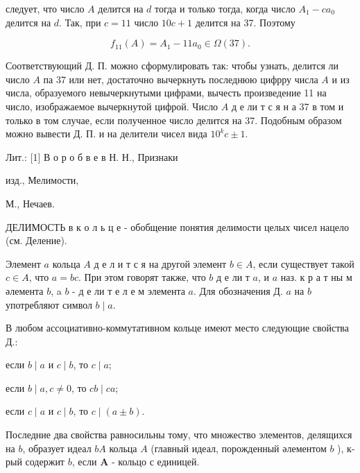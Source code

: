 \documentclass[10pt]{article}
\begin{document}
следует, что число $A$ делится на $d$ тогда и только тогда, когда число $A_{1}-c a_{0}$ делится на $d$. Так, при $c=11$ число $10 c+1$ делится на 37. Поэтому



\[

f_{11}(A)=A_{1}-11 a_{0} \in \Omega(37) .

\]



Соответствующий Д. П. можно сформулировать так: чтобы узнать, делится ли число $A$ па 37 или нет, достаточно вычеркнуть последнюю цифрру числа $A$ и из числа, образуемого невычеркнутыми цифрами, вычесть произведение 11 на число, изображаемое вычеркнутой цифрой. Число $A$ д е ли т с я н а 37 в том и только в том случае, если полученное число делится на 37. Подобным образом можно вывести Д. П. и на делители чисел вида $10^{k} c \pm 1$.



Лит.: [1] В о р о б в е в Н. Н., Признаки

изд., Мелимости,

М., Нечаев.



ДЕЛИМОСТЬ в к о л ь ц е - обобщение понятия делимости целых чисел нацело (см. Деление).



Элемент $a$ кольца $A$ д е л и т с я на другой элемент $b \in A$, если существует такой $c \in A$, что $a=b c$. При этом говорят также, что $b$ д е ли т $a$, и $a$ наз. к р а т ны м әлемента $b$, a $b$ - д е ли т е л е м элемента $a$. Для обозначения Д. $a$ на $b$ употребляют символ $b \mid a$.



В любом ассоциативно-коммутативном кольце имеют место следующие свойства Д.:



если $b \mid a$ и $c \mid b$, то $c \mid a$;



если $b \mid a, c \neq 0$, то $c b \mid c a$;



если $c \mid a$ и $c \mid b$, то $c \mid(a \pm b)$.



Последние два свойства равносильны тому, что множество элементов, делящихся на $b$, образует идеал $b A$ кольца $A$ (главный идеал, порожденный әлементом $b$ ), к-рый содержит $b$, если $\boldsymbol{A}$ - кольцо с единицей.
\end{document}
